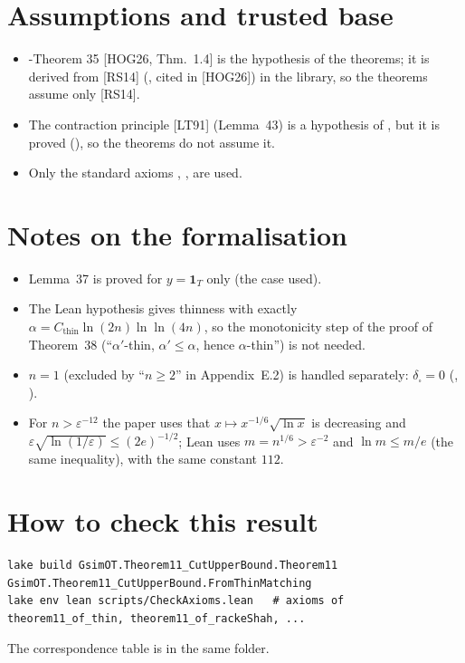 \section{Assumptions and trusted base}
\begin{itemize}
\item \hyp{Theorem 35} [HOG26, Thm.~1.4] is the hypothesis  of the  theorems; it is
derived from [RS14] (, cited in [HOG26]) in the  library, so the
 theorems assume only [RS14].
\item The contraction principle [LT91] (Lemma~43) is a hypothesis of , but it is proved
(), so the  theorems do not assume it.
\item Only the standard axioms , ,  are used.
\end{itemize}

\section{Notes on the formalisation}
\begin{itemize}
\item Lemma~37 is proved for $y=\mathbf1_T$ only (the case used).
\item The Lean hypothesis gives thinness with exactly $\alpha=C_{\mathrm{thin}}\ln(2n)\ln\ln(4n)$, so the monotonicity step of the
proof of Theorem~38 (``$\alpha'$-thin, $\alpha'\le\alpha$, hence $\alpha$-thin'') is not needed.
\item $n=1$ (excluded by ``$n\ge2$'' in Appendix~E.2) is handled separately: $\delta_\square=0$
(, ).
\item For $n>\varepsilon^{-12}$ the paper uses that $x\mapsto x^{-1/6}\sqrt{\ln x}$ is decreasing and
$\varepsilon\sqrt{\ln(1/\varepsilon)}\le(2e)^{-1/2}$; Lean uses $m=n^{1/6}>\varepsilon^{-2}$ and $\ln m\le m/e$ (the same
inequality), with the same constant $112$.
\end{itemize}

\section{How to check this result}
\begin{verbatim}
lake build GsimOT.Theorem11_CutUpperBound.Theorem11 GsimOT.Theorem11_CutUpperBound.FromThinMatching
lake env lean scripts/CheckAxioms.lean   # axioms of theorem11_of_thin, theorem11_of_rackeShah, ...
\end{verbatim}
The correspondence table is  in the same folder.

